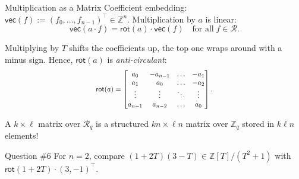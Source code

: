 \documentclass{zkdl-presentation-template}
\begin{document}
    \begin{frame}{Multiplication as a Matrix}
        Coefficient embedding: $\mathsf{vec}(f) := (f_0,\dots,f_{n-1})^{\top} \in \mathbb{Z}^n$. Multiplication by $a$ is linear:
        \begin{equation*}
            \mathsf{vec}(a \cdot f) = \mathsf{rot}(a) \cdot \mathsf{vec}(f) \quad \text{for all} \; f \in \mathcal{R}.
        \end{equation*}
        \pause
        \vspace{-15pt}

        Multiplying by $T$ shifts the coefficients up, the top one wraps around with a minus sign. Hence, $\mathsf{rot}(a)$ is \emph{anti-circulant}:
        \begin{equation*}
            \scalebox{0.85}{$
            \mathsf{rot}(a) = \begin{bmatrix}
                a_0 & -a_{n-1} & \dots & -a_1 \\
                a_1 & a_0 & \dots & -a_2 \\
                \vdots & \vdots & \ddots & \vdots \\
                a_{n-1} & a_{n-2} & \dots & a_0
            \end{bmatrix}.$}
        \end{equation*}
        \pause
        \vspace{-10pt}

        A $k \times \ell$ matrix over $\mathcal{R}_q$ is a structured $kn \times \ell n$ matrix over $\mathbb{Z}_q$ stored in $k\ell n$ elements!
        \pause

        \begin{questionblock}{Question \#6}
            For $n=2$, compare $(1+2T)(3-T) \in \mathbb{Z}[T]/(T^2+1)$ with $\mathsf{rot}(1+2T)\cdot(3,-1)^{\top}$.
        \end{questionblock}
    \end{frame}
\end{document}
